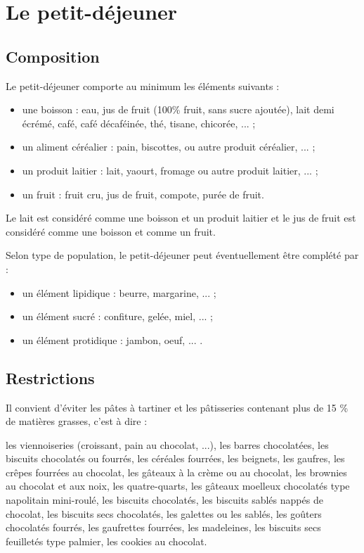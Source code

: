 
\label{annexeA}

\section{Le petit-déjeuner}

\subsection{Composition}

Le petit-déjeuner comporte au minimum les éléments suivants :
\begin{itemize}
	\item une boisson : eau, jus de fruit (100\% fruit, sans sucre ajoutée), lait demi écrémé, café, café décaféinée, thé, tisane, chicorée, ... ;
	\item un aliment céréalier : pain, biscottes, ou autre produit céréalier, ... ;
	\item un produit laitier : lait, yaourt, fromage ou autre produit laitier, ... ;
	\item un fruit : fruit cru, jus de fruit, compote, purée de fruit.
\end{itemize}

Le lait est considéré comme une boisson et un produit laitier et le jus de fruit est considéré comme une boisson et comme un fruit.

Selon type de population, le petit-déjeuner peut éventuellement être complété par :
\begin{itemize}
	\item un élément lipidique  : beurre, margarine, ... ;
	\item un élément sucré : confiture, gelée, miel, ... ;
	\item un élément protidique : jambon, oeuf, ... .
\end{itemize}

\subsection{Restrictions}

Il convient d'éviter les pâtes à tartiner et les pâtisseries contenant plus de 15 \% de matières grasses, c'est à dire :

les viennoiseries (croissant, pain au chocolat, ...), les barres chocolatées, les biscuits chocolatés ou fourrés, les céréales fourrées, les beignets, les gaufres, les crêpes fourrées au chocolat, les gâteaux à la crème ou au chocolat, les brownies au chocolat et aux noix, les quatre-quarts, les gâteaux moelleux chocolatés type napolitain mini-roulé, les biscuits chocolatés, les biscuits sablés nappés de chocolat, les biscuits secs chocolatés, les galettes ou les sablés, les goûters chocolatés fourrés, les gaufrettes fourrées, les madeleines, les biscuits secs feuilletés type palmier, les cookies au chocolat.


